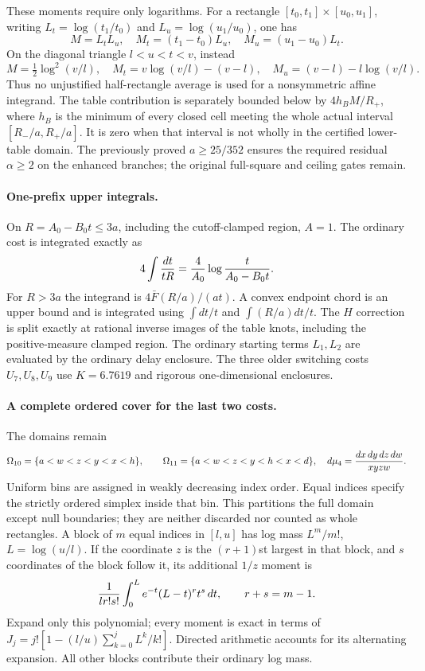 These moments require only logarithms.  For a rectangle $[t_0,t_1]
\times[u_0,u_1]$, writing $L_t=\log(t_1/t_0)$ and
$L_u=\log(u_1/u_0)$, one has
\[
 M=L_tL_u,\quad M_t=(t_1-t_0)L_u,\quad M_u=(u_1-u_0)L_t.
\]
On the diagonal triangle $l<u<t<v$, instead
\[
 M=\tfrac12\log^2(v/l),\quad
 M_t=v\log(v/l)-(v-l),\quad M_u=(v-l)-l\log(v/l).
\]
Thus no unjustified half-rectangle average is used for a nonsymmetric
affine integrand.  The table contribution is separately bounded below
by $4h_BM/R_+$, where $h_B$ is the minimum of every closed cell meeting
the whole actual interval $[R_-/a,R_+/a]$.  It is zero when that interval
is not wholly in the certified lower-table domain.  The previously
proved $a\ge25/352$ ensures the required residual $\alpha\ge2$ on the
enhanced branches; the original full-square and ceiling gates remain.

\paragraph{One-prefix upper integrals.}
On $R=A_0-B_0t\le3a$, including the cutoff-clamped region, $A=1$.
The ordinary cost is integrated exactly as
\[
 4\int{dt\over tR}={4\over A_0}\log{t\over A_0-B_0t}.
\]
For $R>3a$ the integrand is $4\bar F(R/a)/(at)$.  A convex endpoint
chord is an upper bound and is integrated using $\int dt/t$ and
$\int (R/a)dt/t$.  The $H$ correction is split exactly at rational
inverse images of the table knots, including the positive-measure
clamped region.  The ordinary starting terms $L_1,L_2$ are evaluated
by the ordinary delay enclosure.  The three older switching costs
$U_7,U_8,U_9$ use $K=6.7619$ and rigorous one-dimensional enclosures.

\paragraph{A complete ordered cover for the last two costs.}
The domains remain
\[
 \Omega_{10}=\{a<w<z<y<x<h\},\qquad
 \Omega_{11}=\{a<w<z<y<h<x<d\},\quad
 d\mu_4={dx\,dy\,dz\,dw\over xyzw}.
\]
Uniform bins are assigned in weakly decreasing index order.  Equal
indices specify the strictly ordered simplex inside that bin.  This
partitions the full domain except null boundaries; they are neither
discarded nor counted as whole rectangles.  A block of $m$ equal
indices in $[l,u]$ has log mass $L^m/m!$, $L=\log(u/l)$.
If the coordinate $z$ is the $(r+1)$st largest in that block, and $s$
coordinates of the block follow it, its additional $1/z$ moment is
\begin{equation}\label{eq:sharp-tied-bin-moment}
 {1\over l r!s!}\int_0^L e^{-t}(L-t)^r t^s\,dt,
 \qquad r+s=m-1.
\end{equation}
Expand only this polynomial; every moment is exact in terms of
$J_j=j![1-(l/u)\sum_{k=0}^jL^k/k!]$.  Directed arithmetic accounts
for its alternating expansion.  All other blocks contribute their
ordinary log mass.

